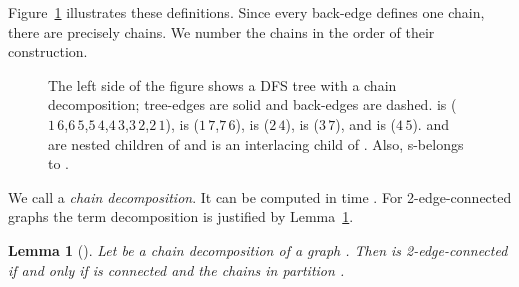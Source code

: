 \documentclass[paper=a4]{scrartcl}
\newtheorem{lemma}{Lemma}
\newcommand{\edge}[2]{\ensuremath{#1\,#2}}
\begin{document}
Figure~\ref{fig:chains} illustrates these definitions. Since every back-edge defines one chain, there are precisely  chains. We number the chains in the order of their construction.
\begin{figure}
\centering
\begin{minipage}{0.4\linewidth}
\end{minipage}
\hfill
\begin{minipage}{0.4\linewidth}
\end{minipage}
\caption{
The left side of the figure shows a DFS tree with a chain decomposition; tree-edges are solid and back-edges are dashed.  is (\edge{1}{6},\edge{6}{5},\edge{5}{4},\edge{4}{3},\edge{3}{2},\edge{2}{1}),  is (\edge{1}{7},\edge{7}{6}),  is (\edge{2}{4}),  is (\edge{3}{7}), and  is (\edge{4}{5}).  and  are nested children of  and  is an interlacing child of . Also,  s-belongs to .} \label{fig:chains}
\end{figure}

We call  a \emph{chain decomposition}. It can be computed in time . For 2-edge-connected graphs the term decomposition is justified by Lemma~\ref{lem:2connectivity}.

\begin{lemma}[\cite{Schmidt2013a}]\label{lem:2connectivity}
Let  be a chain decomposition of a graph . Then  is 2-edge-connected if and only if  is connected and the chains in  partition .
\end{lemma}
\end{document}
